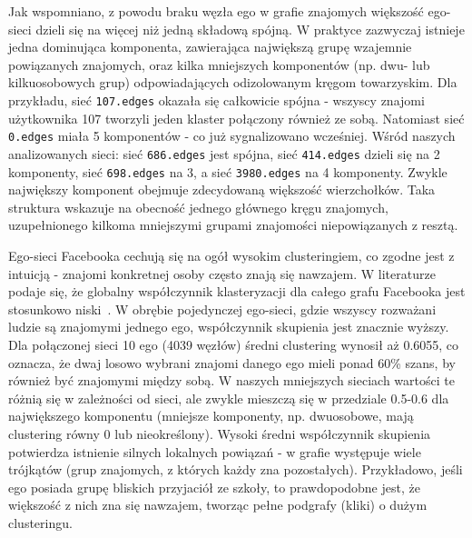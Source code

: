 Jak wspomniano, z powodu braku węzła ego w grafie znajomych większość ego-sieci dzieli się na więcej niż jedną składową spójną. W praktyce zazwyczaj istnieje jedna dominująca komponenta, zawierająca największą grupę wzajemnie powiązanych znajomych, oraz kilka mniejszych komponentów (np. dwu- lub kilkuosobowych grup) odpowiadających odizolowanym kręgom towarzyskim. Dla przykładu, sieć \verb|107.edges| okazała się całkowicie spójna - wszyscy znajomi użytkownika 107 tworzyli jeden klaster połączony również ze sobą. Natomiast sieć \verb|0.edges| miała 5 komponentów - co już sygnalizowano wcześniej. Wśród naszych analizowanych sieci: sieć \verb|686.edges| jest spójna, sieć \verb|414.edges| dzieli się na 2 komponenty, sieć \verb|698.edges| na 3, a sieć \verb|3980.edges| na 4 komponenty. Zwykle największy komponent obejmuje zdecydowaną większość wierzchołków. Taka struktura wskazuje na obecność jednego głównego kręgu znajomych, uzupełnionego kilkoma mniejszymi grupami znajomości niepowiązanych z resztą.

Ego-sieci Facebooka cechują się na ogół wysokim clusteringiem, co zgodne jest z intuicją - znajomi konkretnej osoby często znają się nawzajem. W literaturze podaje się, że globalny współczynnik klasteryzacji dla całego grafu Facebooka jest stosunkowo niski~\cite{Ugander2011}. W obrębie pojedynczej ego-sieci, gdzie wszyscy rozważani ludzie są znajomymi jednego ego, współczynnik skupienia jest znacznie wyższy. Dla połączonej sieci 10 ego (4039 węzłów) średni clustering wynosił aż 0.6055, co oznacza, że dwaj losowo wybrani znajomi danego ego mieli ponad 60\% szans, by również być znajomymi między sobą. W naszych mniejszych sieciach wartości te różnią się w zależności od sieci, ale zwykle mieszczą się w przedziale 0.5-0.6 dla największego komponentu (mniejsze komponenty, np. dwuosobowe, mają clustering równy 0 lub nieokreślony). Wysoki średni współczynnik skupienia potwierdza istnienie silnych lokalnych powiązań - w grafie występuje wiele trójkątów (grup znajomych, z których każdy zna pozostałych). Przykładowo, jeśli ego posiada grupę bliskich przyjaciół ze szkoły, to prawdopodobne jest, że większość z nich zna się nawzajem, tworząc pełne podgrafy (kliki) o dużym clusteringu.

